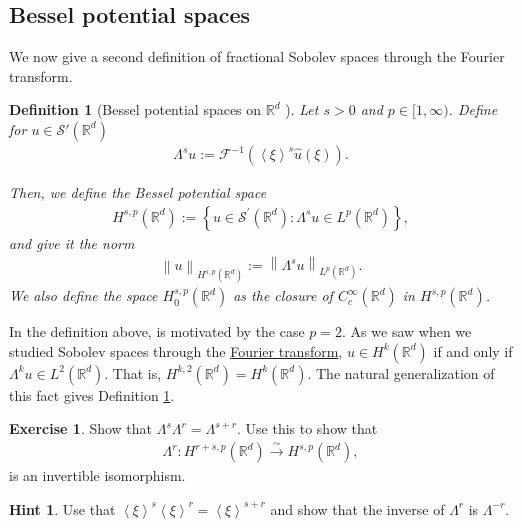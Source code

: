 \documentclass[
    a4paper,
    DIV=14,
    abstract=true,
    numbers=noenddot
]
{scrartcl}
\newtheorem{definition}[theorem]{Definition}
\theoremstyle{definition}
\newtheorem{exercise}{Exercise}
\newtheorem*{hint}{Hint}
\newcommand{\wh}[1]{\widehat{#1}}
\newcommand{\br}[1]{\left\langle#1\right\rangle}
\renewcommand{\norm}[1]{\left\lVert #1 \right\rVert}\renewcommand{\abs}[1]{\left| #1 \right|}
\newcommand{\iso}{\xrightarrow{\sim}}
\newcommand{\R}{\mathbb{R}}
\newcommand{\Ff}{\mathcal{F}}
\newcommand{\Ss}{\mathcal{S}}
\begin{document}
\subsection{Bessel potential spaces}
We now give a second definition of fractional Sobolev spaces through the Fourier transform.
\begin{definition}[Bessel potential spaces on $\R^d$ ]\label{bessel potential def}
    Let $s>0$ and $p \in [1,\infty)$. Define for $u \in \Ss'(\R^d)$
    \begin{align*}
        \Lambda^s u := \Ff^{-1}\left(\br{\xi}^s \wh{u}(\xi)\right).
    \end{align*}

    Then, we define the \emph{Bessel potential space}
    \begin{align*}
        H^{s,p}(\R^d):=\left\{u \in \mathcal{S}^{\prime}(\mathbb{R}^d): \Lambda ^s u \in L^p(\mathbb{R}^d)\right\},
    \end{align*}
    and give it the norm
    \begin{align*}
        \norm{u}_{H^{s,p}(\R^d)}:= \norm{\Lambda^s u}_{L^p(\R^d)}.
    \end{align*}
    We also define the space $H_0^{s,p}(\R^d)$ as the closure of $C_c^\infty(\R^d)$ in $H^{s,p}(\R^d)$.
\end{definition}
In the definition above, is motivated by the case $p=2$. As we saw when we studied Sobolev spaces through the \href{https://nowheredifferentiable.com/2023-01-29-PDE-1-Fourier/#:~:text=Sobolev%20spaces-,Sobolev%20spaces,-form%20a%20particular}{Fourier transform}, $u \in H^k(\R^d)$ if and only if $\Lambda^k u \in L^2(\R^d)$. That is, $H^{k,2}(\R^d)=H^{k}(\R^d)$.
The natural generalization of this fact gives Definition \ref{bessel potential def}.
\begin{exercise}
    Show that $\Lambda^s\Lambda^r=\Lambda^{s+r}$. Use this to show that
    \begin{align*}
        \Lambda^r: H^{r+s,p}(\R^d) \iso  H^{s,p}(\R^d),
    \end{align*}
    is an invertible isomorphism.
\end{exercise}
\begin{hint}
    Use that $\br{\xi}^s\br{\xi}^r=\br{\xi}^{s+r}$ and show that the inverse of $\Lambda^r$ is $\Lambda^{-r}$.
\end{hint}
\end{document}
